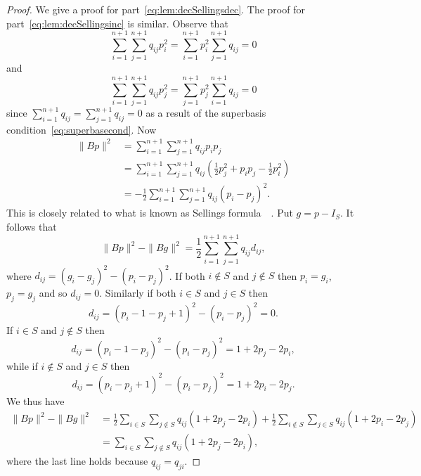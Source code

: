 \documentclass[final,leqno]{siamltex}
\begin{document}
\begin{proof}
We give a proof for part~\ref{eq:lem:decSellingsdec}.  The proof for part~\ref{eq:lem:decSellingsinc} is similar.  Observe that
\[
\sum_{i=1}^{n+1}\sum_{j=1}^{n+1} q_{ij} p_i^2 =  \sum_{i=1}^{n+1}p_i^2\sum_{j=1}^{n+1} q_{ij} = 0
\]
and
\[
\sum_{i=1}^{n+1}\sum_{j=1}^{n+1} q_{ij} p_j^2 =  \sum_{j=1}^{n+1}p_j^2\sum_{i=1}^{n+1} q_{ij} = 0
\]
since $\sum_{i=1}^{n+1} q_{ij} = \sum_{j=1}^{n+1} q_{ij} = 0$ as a result of the superbasis condition~\eqref{eq:superbasecond}.  Now
\begin{align*}
\|Bp\|^2 &= \sum_{i=1}^{n+1} \sum_{j=1}^{n+1} q_{ij} p_i p_j \\
&= \sum_{i=1}^{n+1} \sum_{j=1}^{n+1} q_{ij} (\tfrac{1}{2}p_j^2 + p_i p_j -  \tfrac{1}{2}p_i^2) \\
&= -\frac{1}{2} \sum_{i=1}^{n+1} \sum_{j=1}^{n+1} q_{ij} (p_i - p_j)^2.
\end{align*}
This is closely related to what is known as Sellings formula~\cite[Proposition 2.3.1]{Valentin2003_coverings_tilings_low_dimension}~\cite{Selling1874}.  Put $g = p - I_S$.  It follows that
\[
\|Bp\|^2 - \|Bg\|^2 = \frac{1}{2} \sum_{i=1}^{n+1}\sum_{j=1}^{n+1}q_{ij}d_{ij},
\]
where $d_{ij} = (g_i - g_j)^2 - (p_i - p_j)^2$.  If both $i \notin S$ and $j \notin S$ then $p_i = g_i$, $p_j = g_j$ and so $d_{ij} = 0$.  Similarly if both $i \in S$ and $j \in S$ then 
\[
d_{ij} = (p_i-1 - p_j+1)^2 - (p_i - p_j)^2 = 0.
\]
If $i \in S$ and $j \notin S$ then
\[
d_{ij} = (p_i-1 - p_j)^2 - (p_i - p_j)^2= 1 + 2p_j - 2p_i,
\]
while if $i \notin S$ and $j \in S$ then
\[
d_{ij} = (p_i - p_j+1)^2 - (p_i - p_j)^2 = 1 + 2p_i - 2p_j.
\]
We thus have
\begin{align*}
\|Bp\|^2 - \|Bg\|^2 &= \frac{1}{2} \sum_{i \in S}\sum_{j \notin S}q_{ij}(1 + 2p_j - 2p_i) + \frac{1}{2} \sum_{i \notin S}\sum_{j \in S}q_{ij}(1 + 2p_i - 2p_j) \\
&= \sum_{i \in S}\sum_{j \notin S}q_{ij}(1 + 2p_j - 2p_i),
\end{align*}
where the last line holds because $q_{ij} = q_{ji}$.
\end{proof}

\end{document}
